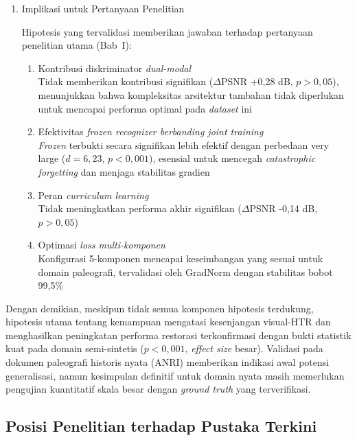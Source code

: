 \begin{enumerate}[leftmargin=1.5em, labelsep=0.5em, itemindent=0pt, label=\arabic*., topsep=0pt, partopsep=0pt]
    \item Implikasi untuk Pertanyaan Penelitian
    
    Hipotesis yang tervalidasi memberikan jawaban terhadap pertanyaan penelitian utama (Bab~I):

    \begin{enumerate}[leftmargin=1.5em, labelsep=0.5em, itemindent=0pt, noitemsep, topsep=0pt, label=\alph*)]
        \item Kontribusi diskriminator \textit{dual-modal} \\
              Tidak memberikan kontribusi signifikan ($\Delta$PSNR +0,28 dB, $p>0,05$), menunjukkan bahwa kompleksitas arsitektur tambahan tidak diperlukan untuk mencapai performa optimal pada \textit{dataset} ini
        \item Efektivitas \textit{frozen recognizer berbanding \textit{joint training}} \\
              \textit{Frozen} terbukti secara signifikan lebih efektif dengan perbedaan very large ($d=6,23$, $p<0,001$), esensial untuk mencegah \textit{catastrophic forgetting} dan menjaga stabilitas gradien
        \item Peran \textit{curriculum learning} \\
              Tidak meningkatkan performa akhir signifikan ($\Delta$PSNR -0,14 dB, $p>0,05$)
        \item Optimasi \textit{loss multi-komponen} \\
              Konfigurasi 5-komponen mencapai keseimbangan yang sesuai untuk domain paleografi, tervalidasi oleh GradNorm dengan stabilitas bobot 99,5\%
    \end{enumerate}
\end{enumerate}

Dengan demikian, meskipun tidak semua komponen hipotesis terdukung, hipotesis utama tentang kemampuan mengatasi kesenjangan visual-HTR dan menghasilkan peningkatan performa restorasi terkonfirmasi dengan bukti statistik kuat pada domain semi-sintetis ($p<0,001$, \textit{effect size} besar). Validasi pada dokumen paleografi historis nyata (ANRI) memberikan indikasi awal potensi generalisasi, namun kesimpulan definitif untuk domain nyata masih memerlukan pengujian kuantitatif skala besar dengan \textit{ground truth} yang terverifikasi.


\subsection{Posisi Penelitian terhadap Pustaka Terkini}
\label{subsec:perbandingan-literatur}

